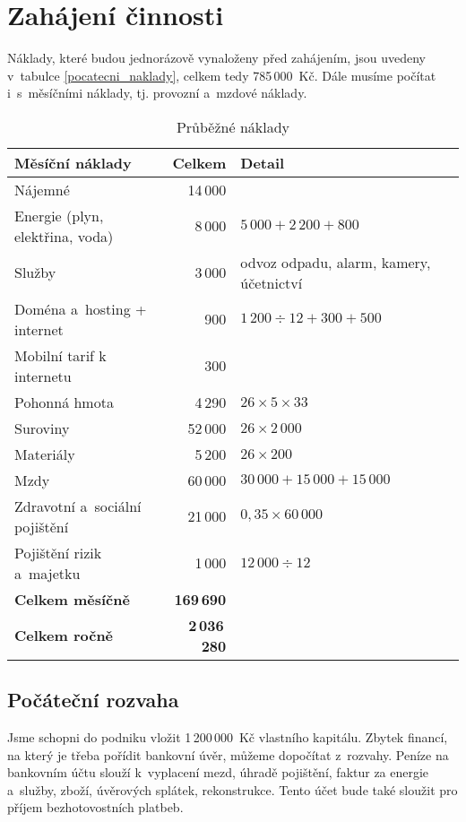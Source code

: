 \section{Zahájení činnosti}
Náklady, které budou jednorázově vynaloženy před zahájením, jsou uvedeny v~tabulce \ref{pocatecni_naklady}, celkem tedy 785\,000~Kč. Dále musíme počítat i~s~měsíčními náklady, tj. provozní a~mzdové náklady.


\begin{table}[htbp]
\begin{center}
\begin{tabular}{ l r l }

\textbf{Měsíční náklady\index{náklad}} & \textbf{Celkem} & \textbf{Detail} \\ \hline 
Nájemné & 14\,000 & \\ 
Energie (plyn, elektřina, voda) & 8\,000 & $5\,000 + 2\,200 + 800$ \\ 
Služby & 3\,000 & odvoz odpadu, alarm, kamery, účetnictví\\ 
Doména a~hosting + internet & 900 & $1\,200 \div 12 + 300 + 500$ \\ 
Mobilní tarif k internetu & 300 & \\ 
Pohonná hmota & 4\,290 & $26 \times 5 \times 33$ \\ 
Suroviny & 52\,000 & $26 \times 2\,000$ \\ 
Materiály & 5\,200 & $26 \times 200$ \\ 
Mzdy\index{mzda} & 60\,000 & $30\,000 + 15\,000 + 15\,000$ \\ 
Zdravotní a~sociální pojištění & 21\,000 & $0,35 \times 60\,000$ \\ 
Pojištění rizik a~majetku & 1\,000 & $12\,000 \div 12$\\ \hline 
\textbf{Celkem měsíčně} & \textbf{169\,690} & \\ 
\textbf{Celkem ročně} & \textbf{2\,036\,280} & \\

\end{tabular}
\caption{Průběžné náklady}
\label{prubezne_naklady}
\end{center}
\end{table}

\subsection{Počáteční rozvaha}
Jsme schopni do podniku vložit 1\,200\,000~Kč vlastního kapitálu. Zbytek financí, na který je třeba pořídit bankovní úvěr, můžeme dopočítat z~rozvahy. Peníze na bankovním účtu slouží k~vyplacení mezd, úhradě pojištění, faktur za energie a~služby, zboží, úvěrových splátek, rekonstrukce. Tento účet bude také sloužit pro příjem bezhotovostních platbeb.


